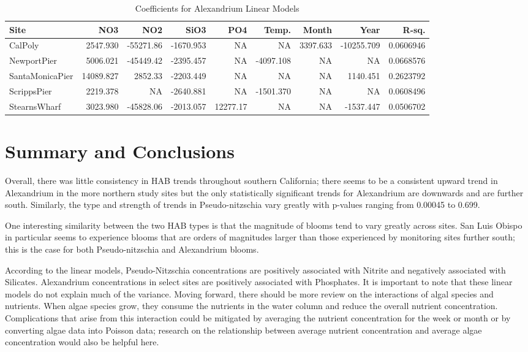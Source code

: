 \documentclass[
  12pt,
]{article}
\begin{document}
\begingroup\fontsize{9}{11}\selectfont

\begin{longtable}[t]{lrrrrrrrr}
\caption{\label{tab:LM Output Tables}Coefficients for Alexandrium Linear Models}\\
\toprule
Site & NO3 & NO2 & SiO3 & PO4 & Temp. & Month & Year & R-sq.\\
\midrule
CalPoly & 2547.930 & -55271.86 & -1670.953 & NA & NA & 3397.633 & -10255.709 & 0.0606946\\
NewportPier & 5006.021 & -45449.42 & -2395.457 & NA & -4097.108 & NA & NA & 0.0668576\\
SantaMonicaPier & 14089.827 & 2852.33 & -2203.449 & NA & NA & NA & 1140.451 & 0.2623792\\
ScrippsPier & 2219.378 & NA & -2640.881 & NA & -1501.370 & NA & NA & 0.0608496\\
StearnsWharf & 3023.980 & -45828.06 & -2013.057 & 12277.17 & NA & NA & -1537.447 & 0.0506702\\
\bottomrule
\end{longtable}
\endgroup{}

\newpage

\hypertarget{summary-and-conclusions}{%
\section{Summary and Conclusions}\label{summary-and-conclusions}}

Overall, there was little consistency in HAB trends throughout southern
California; there seems to be a consistent upward trend in Alexandrium
in the more northern study sites but the only statistically significant
trends for Alexandrium are downwards and are further south. Similarly,
the type and strength of trends in Pseudo-nitzschia vary greatly with
p-values ranging from 0.00045 to 0.699.

One interesting similarity between the two HAB types is that the
magnitude of blooms tend to vary greatly across sites. San Luis Obispo
in particular seems to experience blooms that are orders of magnitudes
larger than those experienced by monitoring sites further south; this is
the case for both Pseudo-nitzschia and Alexandrium blooms.

According to the linear models, Pseudo-Nitzschia concentrations are
positively associated with Nitrite and negatively associated with
Silicates. Alexandrium concentrations in select sites are positively
associated with Phosphates. It is important to note that these linear
models do not explain much of the variance. Moving forward, there should
be more review on the interactions of algal species and nutrients. When
algae species grow, they consume the nutrients in the water column and
reduce the overall nutrient concentration. Complications that arise from
this interaction could be mitigated by averaging the nutrient
concentration for the week or month or by converting algae data into
Poisson data; research on the relationship between average nutrient
concentration and average algae concentration would also be helpful
here.
\end{document}
